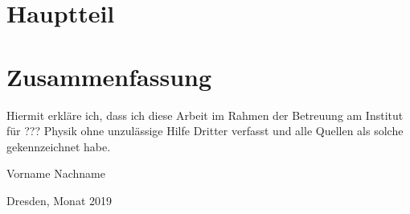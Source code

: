 \chapter{Hauptteil}

\chapter{Zusammenfassung}


\clearpage
\thispagestyle{empty}
\vspace*{1.5em}

Hiermit erkläre ich, dass ich diese Arbeit im Rahmen der Betreuung am Institut
für ??? Physik ohne unzulässige Hilfe Dritter verfasst und alle Quellen als solche gekennzeichnet habe.

\vspace*{45em}

Vorname Nachname \par
Dresden, Monat 2019


